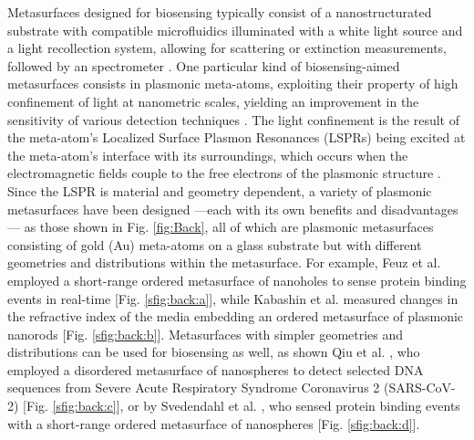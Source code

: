 Metasurfaces designed for biosensing typically consist of a nanostructurated substrate with compatible microfluidics illuminated with a white light source and a light recollection system, allowing for scattering or extinction measurements, followed by an spectrometer \cite{estevez_trends_2014,feuz_improving_2010}. One particular kind of  biosensing-aimed metasurfaces consists in plasmonic meta-atoms, exploiting their property of high confinement of light at nanometric scales, yielding an improvement in the sensitivity of various detection techniques \cite{khan_optical_2022}. The light confinement is the result of the meta-atom's Localized Surface Plasmon Resonances (LSPRs) being excited at the meta-atom's interface with its surroundings, which occurs when the electromagnetic fields couple to the free electrons of the plasmonic structure \cite{chen_review_2016,kim_plasmonic_2019,estevez_trends_2014}.  Since the LSPR is material and geometry dependent, a variety of plasmonic metasurfaces have been designed \cite{feuz_improving_2010,kabashin_plasmonic_2009,qiu_dual_2020,svedendahl_refractometric_2014} ---each with its own benefits and disadvantages \cite{chen_review_2016,estevez_trends_2014}--- as those shown in  Fig. \ref{fig:Back}, all of which are plasmonic metasurfaces consisting of gold (Au) meta-atoms on a glass substrate but with different geometries and distributions within the metasurface.  For example, Feuz et al. \cite{feuz_improving_2010} employed a short-range ordered metasurface of nanoholes to sense protein binding events in real-time [Fig. \ref{sfig:back:a}], while  Kabashin et al. \cite{kabashin_plasmonic_2009} measured  changes in the refractive index of the media embedding an ordered metasurface of plasmonic nanorods [Fig. \ref{sfig:back:b}].  Metasurfaces with simpler geometries and distributions can be used  for biosensing as well, as shown Qiu et al. \cite{qiu_dual_2020}, who employed a disordered metasurface of nanospheres to detect selected DNA sequences from Severe Acute Respiratory Syndrome Coronavirus 2 (SARS-CoV-2) [Fig. \ref{sfig:back:c}], or by Svedendahl et al. \cite{svedendahl_refractometric_2014}, who sensed protein binding events with a short-range ordered metasurface of nanospheres [Fig. \ref{sfig:back:d}].

